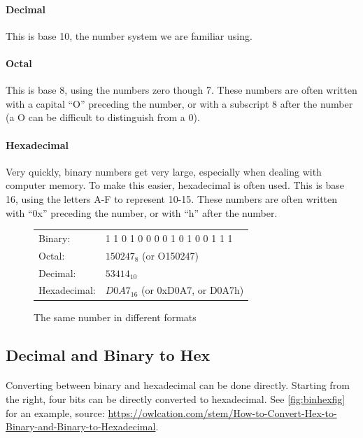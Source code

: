 \documentclass[letter,11pt]{article}
\begin{document}
\paragraph{Decimal}This is base 10, the number system we are familiar using.

\paragraph{Octal}This is base 8, using the numbers zero though 7. These numbers are often written with a capital ``O'' preceding the number, or with a subscript 8 after the number (a O can be difficult to distinguish from a 0).

\paragraph{Hexadecimal}Very quickly, binary numbers get very large, especially when dealing with computer memory. To make this easier, hexadecimal is often used. This is base 16, using the letters A-F to represent 10-15. These numbers are often written with ``0x'' preceding the number, or with ``h'' after the number.

\begin{figure}[h!]
    \centering
    \begin{tabular}{l l}
         Binary:      & 1 1 0 1 0 0 0 0 1 0 1 0 0 1 1 1  \\
         Octal:       & $150247_8$ (or O150247) \\
         Decimal:     & $53414_{10}$ \\
         Hexadecimal: & $D0A7_{16}$ (or 0xD0A7, or D0A7h)
    \end{tabular}
    \caption{The same number in different formats}
    \label{fig:datatypesequivalent}
\end{figure}

\subsection{Decimal and Binary to Hex}
\paragraph{}Converting between binary and hexadecimal can be done directly. Starting from the right, four bits can be directly converted to hexadecimal. See \autoref{fig:binhexfig} for an example, source: \url{https://owlcation.com/stem/How-to-Convert-Hex-to-Binary-and-Binary-to-Hexadecimal}.
\end{document}

